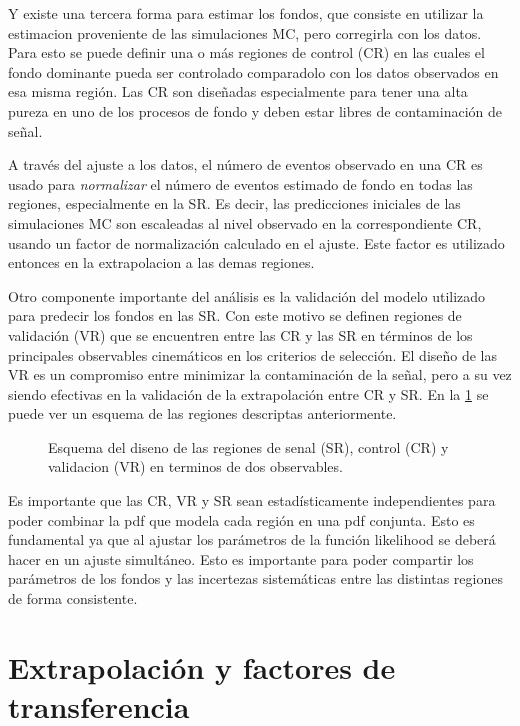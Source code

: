 Y existe una tercera forma para estimar los fondos, que consiste en utilizar la estimacion
proveniente de las simulaciones MC, pero corregirla con los datos. Para
esto se puede definir una o más regiones de control (CR) en las cuales el fondo dominante
pueda ser controlado comparadolo con los datos observados en esa misma región. Las CR
son diseñadas especialmente para tener una alta pureza en uno de los procesos de fondo
y deben estar libres de contaminación de señal.

A través del ajuste a los datos, el número de eventos observado en una CR es usado para
\emph{normalizar} el número de eventos estimado de fondo en todas las regiones, especialmente
en la SR. Es decir, las predicciones iniciales de las simulaciones MC son escaleadas al
nivel observado en la correspondiente CR, usando un factor de normalización calculado en
el ajuste. Este factor es utilizado entonces en la extrapolacion a las demas regiones.

Otro componente importante del análisis es la validación del modelo utilizado
para predecir los fondos en las SR. Con este motivo se definen regiones de validación
(VR) que se encuentren entre las CR y las SR en términos de los principales observables
cinemáticos en los criterios de selección. El diseño de las VR es un compromiso entre
minimizar la contaminación de la señal, pero a su vez siendo efectivas en la validación
de la extrapolación entre CR y SR. En la \cref{fig:regions_sketch} se puede ver
un esquema de las regiones descriptas anteriormente.

\begin{figure}[h]
  \centering
  
  \caption{Esquema del diseno de las regiones de senal (SR), control (CR) y validacion (VR)
  en terminos de dos observables.}
  \label{fig:regions_sketch}
\end{figure}

Es importante que las CR, VR y SR sean estadísticamente independientes para poder combinar
la pdf que modela cada región en una pdf conjunta. Esto es fundamental ya que al ajustar
los parámetros de la función likelihood se deberá hacer en un ajuste simultáneo. Esto es
importante para poder compartir los parámetros de los fondos y las incertezas sistemáticas
entre las distintas regiones de forma consistente.

\section{Extrapolación y factores de transferencia}

